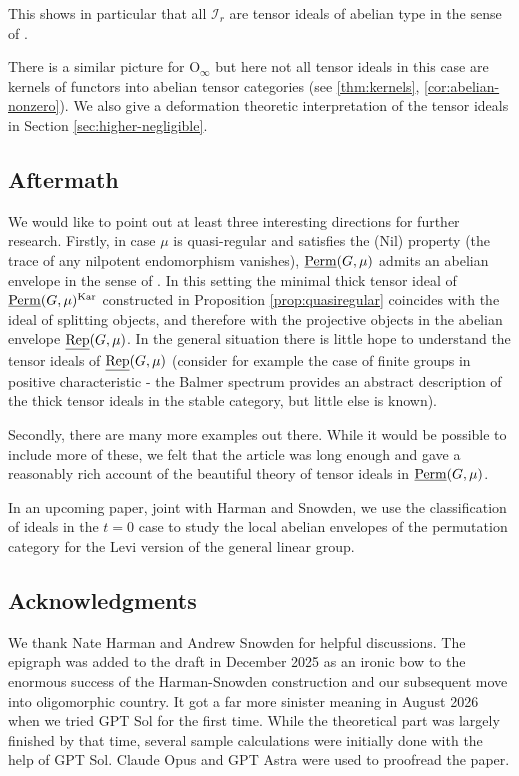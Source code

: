 \documentclass[11pt,a4paper]{amsart}
\theoremstyle{plain}%
\theoremstyle{definition}
\theoremstyle{remark}
\newcommand{\uRep}{\underline{{\rm Rep}}}
\newcommand{\Perm}{\underline{{\rm Perm}}}
\newcommand{\Kar}{\mathrm{Kar}}
\newcommand{\I}{\mathcal{I}}
\begin{document}
This shows in particular that all $\I_r$ are tensor ideals of abelian type in the sense of \cite{CEO-abelian}.

There is a similar picture for $\mathrm{O_{\infty}}$ but here not all tensor ideals in this case are kernels of {functors} into abelian tensor categories (see \cref{thm:kernels}, \cref{cor:abelian-nonzero}). We also give a deformation theoretic interpretation of the tensor ideals in Section \ref{sec:higher-negligible}.



\subsection{Aftermath} We would like to point out at least three interesting directions for further research.
Firstly, in case $\mu$ is quasi-regular and satisfies the (Nil) property (the trace of any nilpotent endomorphism vanishes), $\Perm(G,\mu)$ admits an abelian envelope in the sense of \cite{CEAH,Coulembier-abelian}. In this setting the minimal thick tensor ideal of $\Perm(G,\mu)^{\Kar}$ constructed in Proposition \ref{prop:quasiregular} coincides with the ideal of splitting objects, and therefore with the projective objects in the abelian envelope $\uRep(G,\mu)$. In the general situation there is little hope to understand the tensor ideals of $\uRep(G,\mu)$ (consider for example the case of finite groups in positive characteristic - the Balmer spectrum provides an abstract description of the thick tensor ideals in the stable category, but little else is known). 



Secondly, there are many more examples out there. While it would be possible to include more of these, we felt that the article was long enough and gave a reasonably rich account of the beautiful theory of tensor ideals in $\Perm(G,\mu)$. 

In an upcoming paper, joint with Harman and Snowden, we use the classification of ideals in the $t=0$ case to study the local abelian envelopes of the permutation category for the Levi version of the general linear group.



\subsection{Acknowledgments} We thank Nate Harman and Andrew Snowden for helpful discussions. The epigraph was added to the draft in December 2025 as an ironic bow to the enormous success of the Harman-Snowden construction and our subsequent move into oligomorphic country. It got a far more sinister meaning in August 2026 when we tried GPT Sol for the first time. While the theoretical part was largely finished by that time, several sample calculations were initially done with the help of GPT Sol. Claude Opus and GPT Astra were used to proofread the paper.
\end{document}
